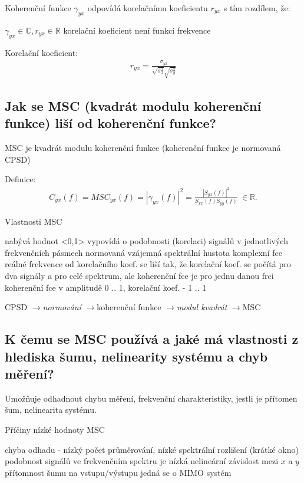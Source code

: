 \documentclass[a4paper,12pt]{article}   %
\newcommand{\rrarr}{$\rightarrow$}
\newcommand{\mt}[1]{$#1$}
\newcommand{\yx}{_{yx}}
\newcommand{\xx}{_{xx}}
\newcommand{\yy}{_{yy}}
\begin{document}
Koherenční funkce \mt{\gamma_{yx}} odpovídá korelačnímu koeficientu \mt{r_{yx}} s tím rozdílem, že:
\begin{outline}
        \1 \mt{\gamma_{yx} \in \mathbb{C}, r_{yx} \in \mathbb{R}}
        \1 korelační koeficient není funkcí frekvence
\end{outline}

Korelační koeficient:
\begin{align*}
        r_{yx} = \frac{\sigma_{yx}}{\sqrt{\sigma_x^2}\sqrt{\sigma_y^2}}
\end{align*}


\subsection{Jak se MSC (kvadrát modulu koherenční funkce) liší od koherenční funkce?}

MSC je  kvadrát modulu koherenční funkce (koherenční funkce je normovaná CPSD)

Definice:
\begin{align*}
        C_{yx}(f) = MSC_{yx}(f) = |\gamma_{yx}(f)|^2 = \frac{|S\yx (f)|^2 }{S\xx (f)S\yy (f)} ~\in \mathbb{R}.
\end{align*}

Vlastnosti MSC
\begin{outline}
        \1 nabývá hodnot <0,1>
        \1 vypovídá o podobnosti (korelaci) signálů v jednotlivých frekvenčních pásmech
        \1 normovaná vzájemná spektrální hustota
        \1 komplexní fce reálné frekvence
        \1 od korelačního koef. se liší tak, že korelační koef. se počítá pro dva signály a pro celé spektrum, ale koherenční fce je pro jednu danou frci
        \1 koherenční fce v amplitudě 0 .. 1, korelační koef. - 1 .. 1
\end{outline}


CPSD \rrarr \textit{normování} \rrarr koherenční funkce \rrarr \textit{modul kvadrát} \rrarr MSC


\subsection{K čemu se MSC používá a jaké má vlastnosti z hlediska šumu, nelinearity systému a chyb měření?}

Umožňuje odhadnout chybu měření, frekvenční charakteristiky, jestli je přítomen šum, nelinearita systému.

Příčiny nízké hodnoty MSC
\begin{outline}
        \1 chyba odhadu - nízký počet průměrování, nízké spektrální rozlišení (krátké okno)
        \1 podobnost signálů ve frekvenčním spektru je nízká
        \1 nelineární závislost mezi \mt{x} a \mt{y}
        \1 přítomnost šumu na vstupu/výstupu
        \1 jedná se o MIMO systém
\end{outline}
\end{document}
